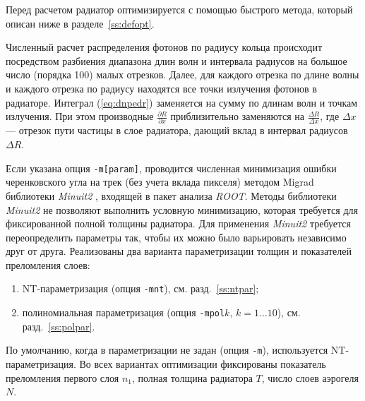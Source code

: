 \documentclass[12pt]{article}
\begin{document}
Перед расчетом радиатор оптимизируется с помощью быстрого метода, который описан ниже в разделе~\ref{ss:defopt}.

Численный расчет распределения фотонов по радиусу кольца происходит посредством разбиения диапазона длин волн и интервала 
радиусов на большое число (порядка 100) малых отрезков. Далее, для каждого отрезка по длине волны и каждого отрезка по радиусу находятся 
все точки излучения фотонов в радиаторе. Интеграл (\ref{eq:dnpedr}) заменяется на сумму по длинам волн и точкам излучения.
При этом производные $\frac{\partial R}{\partial x}$ приблизительно заменяются на $\frac{\Delta R}{\Delta x}$, где $\Delta x$ --- отрезок пути частицы 
в слое радиатора, дающий вклад в интервал радиусов $\Delta R$.

Если указана опция {\tt -m[param]}, проводится численная минимизация ошибки черенковского угла на трек (без учета вклада пикселя) 
методом Migrad библиотеки {\em Minuit2} \cite{minuit2}, входящей в пакет анализа {\em ROOT}. Методы библиотеки {\em Minuit2} не 
позволяют выполнить условную минимизацию, которая требуется для фиксированной полной толщины радиатора. 
Для применения {\em Minuit2} требуется переопределить параметры так, чтобы их можно было варьировать независимо друг от друга.
Реализованы два варианта параметризации толщин и показателей преломления слоев:
\begin{enumerate}
\item NT-параметризация (опция {\tt -mnt}), см. разд.~\ref{ss:ntpar};
\item полиномиальная параметризация (опция {\tt -mpol$k$}, $k=1\ldots 10$), см. разд.~\ref{ss:polpar}.
\end{enumerate}
По умолчанию, когда в параметризации не задан (опция {\tt -m}), используется NT-параметризация.
Во всех вариантах оптимизации фиксированы показатель преломления первого слоя $n_1$, полная толщина радиатора $T$, число слоев аэрогеля $N$.
\end{document}
